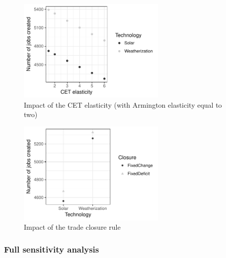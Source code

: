\begin{figure}[!h]
	\centering
	\includegraphics[height=5cm]{figures/CET.pdf}
	\caption{Impact of the CET elasticity (with Armington elasticity equal to two)}
	\label{fig:cet}
\end{figure}

\begin{figure}[!h]
	\centering
	\includegraphics[height=5cm]{figures/closure.pdf}
	\caption{Impact of the trade closure rule}
	\label{fig:closure}
\end{figure}

\subsubsection{Full sensitivity analysis}
\label{sec:full_sensitivity}

